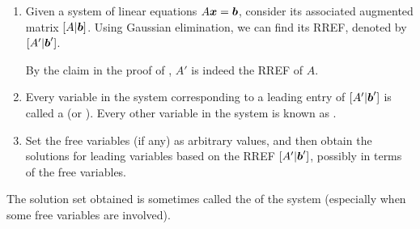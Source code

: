 \begin{enumerate}
\begin{enumerate}
\item Given a system of linear equations \(A\vb*{x}=\vb*{b}\), consider its
associated augmented matrix \([A|\vb*{b}]\). Using Gaussian elimination, we
can find its RREF, denoted by \([A'|\vb*{b}']\). \begin{note}
By the claim in the proof of , \(A'\) is indeed the RREF
of \(A\).
\end{note}

\item Every variable in the system corresponding to a leading entry of
\([A'|\vb*{b}']\) is called a  (or ). Every other variable in the system is known as .
\item Set the free variables (if any) as arbitrary values, and then obtain the
solutions for leading variables based on the RREF \([A'|\vb*{b}']\), possibly
in terms of the free variables.
\end{enumerate}
\begin{note}
The solution set obtained is sometimes called the  of
the system (especially when some free variables are involved).
\end{note}
\end{enumerate}
